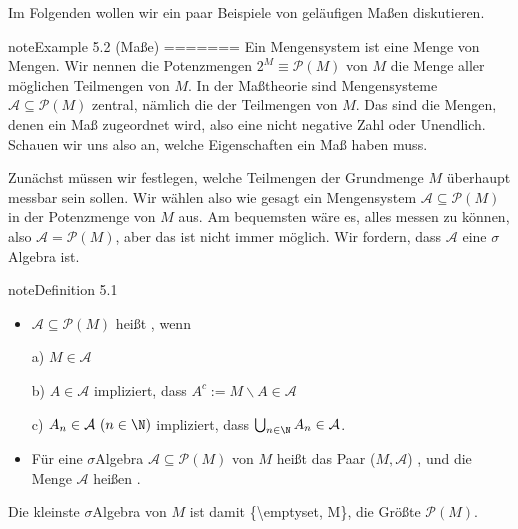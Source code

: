 \documentclass[letterpaper,10pt,english]{jupyterBook}
\begin{document}
\sphinxAtStartPar
Im Folgenden wollen wir ein paar Beispiele von geläufigen Maßen diskutieren.
\label{masstheorie/masstheorie:example-5}
\begin{sphinxadmonition}{note}{Example 5.2 (Maße)}
=======
Ein Mengensystem ist eine Menge von Mengen. Wir nennen die Potenzmengen \(2^M \equiv\mathcal{P}(M)\) von \(M\) die Menge aller möglichen Teilmengen von \(M\). In der Maßtheorie sind Mengensysteme \(\mathcal{A} \subseteq \mathcal{P}(M)\) zentral, nämlich die der  Teilmengen von \(M\). Das sind die Mengen, denen ein Maß zugeordnet wird, also eine nicht negative Zahl oder Unendlich. Schauen wir uns also an, welche Eigenschaften ein Maß haben muss.

\sphinxAtStartPar
Zunächst müssen wir festlegen, welche Teilmengen der Grundmenge \(M\) überhaupt messbar sein sollen. Wir wählen also wie gesagt ein Mengensystem \(\mathcal{A} \subseteq \mathcal{P}(M)\) in der Potenzmenge von \(M\) aus.
Am bequemsten wäre es, alles messen zu können, also \(\mathcal{A} = \mathcal{P}(M)\), aber das ist nicht immer möglich. Wir fordern, dass \(\mathcal{A}\) eine \(\sigma\)\sphinxhyphen{}Algebra ist.
\label{masstheorie/masstheorie:def:sigmaalgebra}
\begin{sphinxadmonition}{note}{Definition 5.1}


\begin{itemize}
\item {} 
\sphinxAtStartPar
\(\mathcal{A} \subseteq \mathcal{P}(M)\) heißt , wenn

\sphinxAtStartPar
a) \(M\in \mathcal{A}\)

\sphinxAtStartPar
b) \(A\in \mathcal{A}\) impliziert, dass \(A^c:=M\backslash A\in \mathcal{A}\)

\sphinxAtStartPar
c) \(A_n\in \mathcal{A}\ (n\in\N)\) impliziert, dass \(\bigcup_{n\in \N} A_n\in \mathcal{A}\).

\item {} 
\sphinxAtStartPar
Für eine \(\sigma\)\sphinxhyphen{}Algebra \(\mathcal{A} \subseteq \mathcal{P}(M)\) von \(M\) heißt das Paar (\(M,\mathcal{A}\)) , und die Menge \(\mathcal{A}\) heißen .

\end{itemize}
\end{sphinxadmonition}

\sphinxAtStartPar
Die kleinste \(\sigma\)\sphinxhyphen{}Algebra von \(M\) ist damit \{\textbackslash{}emptyset, M\}, die Größte \(\mathcal{P}(M)\).


\end{sphinxadmonition}
\end{document}

